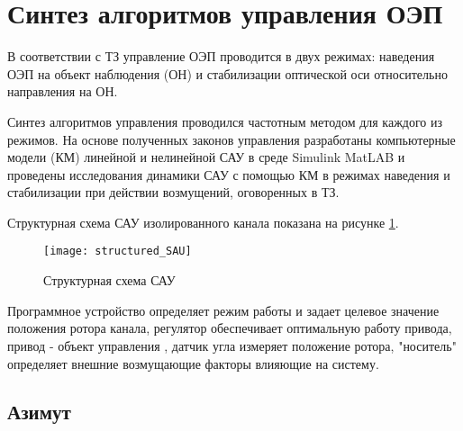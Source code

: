 \section{Синтез алгоритмов управления ОЭП} \label{ch:ch4/sect4-}

В соответствии с ТЗ управление ОЭП проводится в двух режимах:
наведения ОЭП на объект наблюдения (ОН) и стабилизации оптической оси относительно направления на ОН. 

Синтез алгоритмов управления проводился частотным методом \cite[]{Bessekerski} для каждого из режимов. На основе полученных законов управления разработаны компьютерные модели (КМ) линейной и нелинейной САУ в среде Simulink MatLAB и проведены исследования динамики САУ с помощью КМ в режимах наведения и стабилизации при действии возмущений, оговоренных в ТЗ.

Структурная схема САУ изолированного канала показана на рисунке \ref{fig:structured_SAU}.

\begin{figure}[ht]
	\centering
	\texttt{[image: structured\_SAU]}
	\caption{Структурная схема САУ}
	\label{fig:structured_SAU}
\end{figure}

Программное устройство определяет режим работы и задает целевое значение положения ротора канала, регулятор обеспечивает оптимальную работу привода, привод - объект управления , 
датчик угла измеряет положение ротора, "носитель" определяет внешние возмущающие факторы влияющие на систему.

\subsection{Азимут} \label{ch:ch4/sect4-/sub1}

